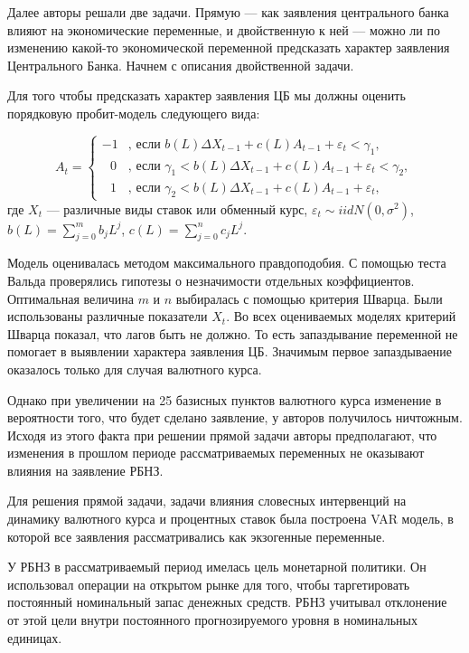 \documentclass[14pt,a4paper, oneside]{extreport}
\begin{document}
Далее авторы решали две задачи. Прямую --- как заявления центрального банка влияют на экономические переменные, и двойственную к ней --- можно ли по изменению какой-то экономической переменной предсказать характер заявления Центрального Банка. Начнем с описания двойственной задачи.

 Для того чтобы предсказать характер заявления ЦБ мы должны оценить порядковую пробит-модель следующего вида:

\begin{equation}
A_t = \begin{cases} -1 &\text{, если } b(L) \Delta X_{t-1} + c(L) A_{t-1} + \varepsilon_t < \gamma_1, \\
\mbox{ }0 &\text{, если } \gamma_1 < b(L) \Delta X_{t-1} + c(L) A_{t-1} + \varepsilon_t < \gamma_2, \\
\mbox{ }1 &\text{, если } \gamma_2 < b(L) \Delta X_{t-1} + c(L) A_{t-1} + \varepsilon_t, 
\end{cases}
\end{equation} где $X_{t}$ --- различные виды ставок или обменный курс, $\varepsilon_t \sim iid N (0, \sigma^2)$, $b(L) = \sum_{j=0}^m b_j L^j$, $c(L) = \sum_{j=0}^n c_j L^j$. 

Модель оценивалась методом максимального правдоподобия. С помощью теста Вальда проверялись гипотезы о незначимости отдельных коэффициентов. Оптимальная величина $m$ и $n$ выбиралась с помощью критерия Шварца. Были использованы различные показатели $X_t$. Во всех оцениваемых моделях критерий Шварца показал, что лагов быть не должно. То есть запаздывание переменной не помогает в выявлении характера заявления ЦБ. Значимым первое запаздываение оказалось только для случая валютного курса. 

Однако при увеличении на 25 базисных пунктов валютного курса изменение в вероятности того, что будет сделано заявление, у авторов получилось ничтожным. Исходя из этого факта при решении прямой задачи авторы предполагают, что изменения в прошлом периоде рассматриваемых переменных не оказывают влияния на заявление РБНЗ.

Для решения прямой задачи, задачи влияния словесных интервенций на динамику валютного курса и процентных ставок была построена VAR модель, в которой все заявления рассматривались как экзогенные переменные.

У РБНЗ в рассматриваемый период имелась цель монетарной политики. Он использовал операции на открытом рынке для того, чтобы таргетировать постоянный номинальный запас денежных средств. РБНЗ учитывал отклонение от этой цели внутри постоянного прогнозируемого уровня в номинальных единицах. 
\end{document}
